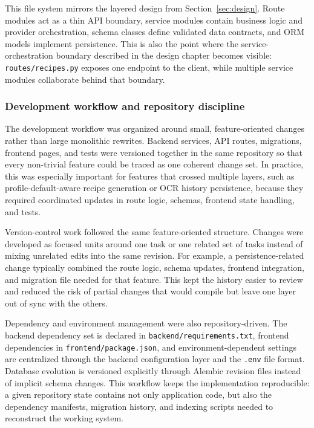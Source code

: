 This file system mirrors the layered design from Section~\ref{sec:design}. Route
modules act as a thin API boundary, service modules contain business
logic and provider orchestration, schema classes define validated data
contracts, and ORM models implement persistence. This is also the point
where the service-orchestration boundary described in the design chapter
becomes visible:
\texttt{routes/recipes.py} exposes one endpoint to the client, while
multiple service modules collaborate behind that boundary.

\subsubsection{Development workflow and repository discipline}

The development workflow was organized around small, feature-oriented
changes rather than large monolithic rewrites. Backend services, API
routes, migrations, frontend pages, and tests were versioned together in
the same repository so that every non-trivial feature could be traced as
one coherent change set. In practice, this was especially important for
features that crossed multiple layers, such as profile-default-aware
recipe generation or OCR history persistence, because they required
coordinated updates in route logic, schemas, frontend state handling,
and tests.

Version-control work followed the same feature-oriented structure.
Changes were developed as focused units around one task or one related
set of tasks instead of mixing unrelated edits into the same revision.
For example, a persistence-related change typically combined the route
logic, schema updates, frontend integration, and migration file needed
for that feature. This kept the history easier to review and reduced the
risk of partial changes that would compile but leave one layer out of
sync with the others.

Dependency and environment management were also repository-driven. The
backend dependency set is declared in
\texttt{backend/requirements.txt}, frontend dependencies in
\texttt{frontend/package.json}, and environment-dependent settings are
centralized through the backend configuration layer and the
\texttt{.env} file format. Database evolution is versioned explicitly
through Alembic revision files instead of implicit schema changes. This
workflow keeps the implementation reproducible: a given repository state
contains not only application code, but also the dependency manifests,
migration history, and indexing scripts needed to reconstruct the
working system.

